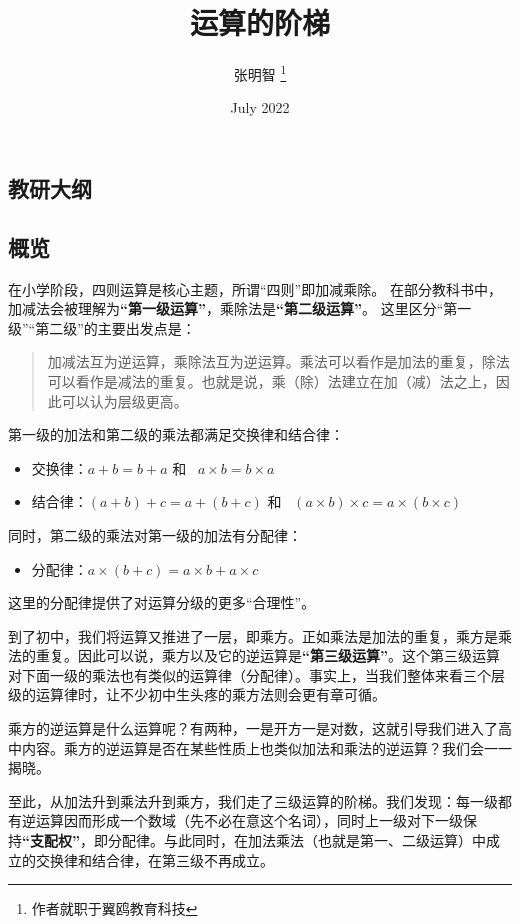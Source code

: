 \documentclass{article}
\title{运算的阶梯}
\author{张明智 \thanks{作者就职于翼鸥教育科技}}
\date{July 2022}
\begin{document}
\begin{CJK*}{UTF8}{gbsn}

\maketitle

\section{教研大纲}
\subsection{概览}
在小学阶段，四则运算是核心主题，所谓“四则”即加减乘除。
在部分教科书中，加减法会被理解为\textbf{“第一级运算”}，乘除法是\textbf{“第二级运算”}。
这里区分“第一级”“第二级”的主要出发点是：

\begin{quote}
    加减法互为逆运算，乘除法互为逆运算。乘法可以看作是加法的重复，除法可以看作是减法的重复。也就是说，乘（除）法建立在加（减）法之上，因此可以认为层级更高。
\end{quote}

\noindent 第一级的加法和第二级的乘法都满足交换律和结合律：
\begin{itemize}
    \item 交换律：\( a + b = b + a \) 和 \ \( a \times b = b \times a \)
    \item 结合律：\( (a + b) + c = a +(b + c) \) 和 \ \( (a \times b) \times c = a \times (b \times c) \)
\end{itemize}
同时，第二级的乘法对第一级的加法有分配律：
\begin{itemize}
    \item 分配律：\( a \times (b + c) = a \times b + a \times c \)
\end{itemize}
这里的分配律提供了对运算分级的更多“合理性”。

到了初中，我们将运算又推进了一层，即乘方。正如乘法是加法的重复，乘方是乘法的重复。因此可以说，乘方以及它的逆运算是\textbf{“第三级运算”}。这个第三级运算对下面一级的乘法也有类似的运算律（分配律）。事实上，当我们整体来看三个层级的运算律时，让不少初中生头疼的乘方法则会更有章可循。

乘方的逆运算是什么运算呢？有两种，一是开方一是对数，这就引导我们进入了高中内容。乘方的逆运算是否在某些性质上也类似加法和乘法的逆运算？我们会一一揭晓。

至此，从加法升到乘法升到乘方，我们走了三级运算的阶梯。我们发现：每一级都有逆运算因而形成一个数域（先不必在意这个名词），同时上一级对下一级保持\textbf{“支配权”}，即分配律。与此同时，在加法乘法（也就是第一、二级运算）中成立的交换律和结合律，在第三级不再成立。


\end{CJK*}
\end{document}
